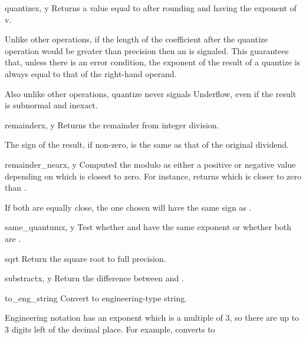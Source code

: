 \begin{methoddesc}{quantize}{x, y}
  Returns a value equal to  after rounding and having the
  exponent of v.

  Unlike other operations, if the length of the coefficient after the quantize
  operation would be greater than precision then an
   is signaled. This guarantees that, unless there
  is an error condition, the exponent of the result of a quantize is always
  equal to that of the right-hand operand.

  Also unlike other operations, quantize never signals Underflow, even
  if the result is subnormal and inexact.  
\end{methoddesc} 

\begin{methoddesc}{remainder}{x, y}
  Returns the remainder from integer division.

  The sign of the result, if non-zero, is the same as that of the original
  dividend. 
\end{methoddesc}
 
\begin{methoddesc}{remainder_near}{x, y}
  Computed the modulo as either a positive or negative value depending
  on which is closest to zero.  For instance,
   returns 
  which is closer to zero than .

  If both are equally close, the one chosen will have the same sign
  as .
\end{methoddesc}

\begin{methoddesc}{same_quantum}{x, y}
  Test whether  and  have the same exponent or whether both are
  .
\end{methoddesc}

\begin{methoddesc}{sqrt}{}
  Return the square root to full precision.
\end{methoddesc}                    

\begin{methoddesc}{substract}{x, y}
  Return the difference between  and .
\end{methoddesc}
 
\begin{methoddesc}{to_eng_string}{}
  Convert to engineering-type string.

  Engineering notation has an exponent which is a multiple of 3, so there
  are up to 3 digits left of the decimal place.  For example, converts
   to 
\end{methoddesc}  

